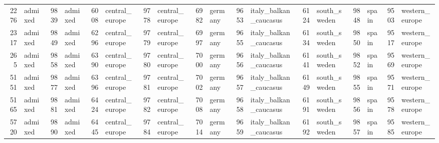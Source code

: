 \begin{table}[h]
{\begin{tabular}{rl|rl|rl|rl|rl|rl|rl|rl|rl}
			2276                   & admixed         & 9839                   & admixed         & 6008                   & central\_europe & 9778                   & central\_europe & 6982                   & germany                 & 9653                   & italy\_balkan\_caucasus & 6124                   & south\_sweden   & 9848                   & spain           & \multicolumn{1}{r}{9503} & western\_europe \\
			2317                   & admixed         & 9849                   & admixed         & 6296                   & central\_europe & 9779                   & central\_europe & 6997                   & germany                 & 9655                   & italy\_balkan\_caucasus & 6134                   & south\_sweden   & 9850                   & spain           & \multicolumn{1}{r}{9517} & western\_europe \\
			265                    & admixed         & 9858                   & admixed         & 6390                   & central\_europe & 9780                   & central\_europe & 7000                   & germany                 & 9656                   & italy\_balkan\_caucasus & 6141                   & south\_sweden   & 9852                   & spain           & \multicolumn{1}{r}{9569} & western\_europe \\
			5151                   & admixed         & 9877                   & admixed         & 6396                   & central\_europe & 9781                   & central\_europe & 7002                   & germany                 & 9657                   & italy\_balkan\_caucasus & 6149                   & south\_sweden   & 9855                   & spain           & \multicolumn{1}{r}{9571} & western\_europe \\
			5165                   & admixed         & 9881                   & admixed         & 6424                   & central\_europe & 9782                   & central\_europe & 7008                   & germany                 & 9658                   & italy\_balkan\_caucasus & 6191                   & south\_sweden   & 9856                   & spain           & \multicolumn{1}{r}{9578} & western\_europe \\
			5720                   & admixed         & 9890                   & admixed         & 6445                   & central\_europe & 9784                   & central\_europe & 7014                   & germany                 & 9659                   & italy\_balkan\_caucasus & 6192                   & south\_sweden   & 9857                   & spain           & \multicolumn{1}{r}{9585} & western\_europe \\

\end{tabular}}
\end{table}
